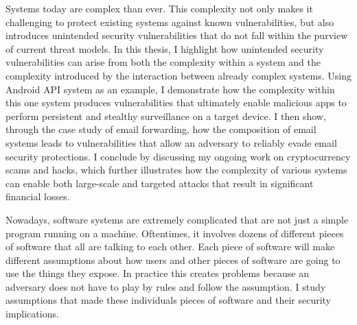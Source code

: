 \documentclass[12pt]{ucsddissertation}
\begin{document}
\begin{dissertationabstract} 
Systems today are complex than ever. This complexity not only makes it challenging to protect existing systems against known vulnerabilities, but also introduces unintended security vulnerabilities that do not fall within the purview of current threat models. In this thesis, I highlight how unintended security vulnerabilities can arise from both the complexity within a system and the complexity introduced by the interaction between already complex systems. Using Android API system as an example, I demonstrate how the complexity within this one system produces vulnerabilities that ultimately enable malicious apps to perform persistent and stealthy surveillance on a target device. I then show, through the case study of email forwarding, how the composition of email systems leads to vulnerabilities that allow an adversary to reliably evade email security protections. I conclude by discussing my ongoing work on cryptocurrency scams and hacks, which further illustrates how the complexity of various systems can enable both large-scale and targeted attacks that result in significant financial losses.

Nowadays, software systems are extremely complicated that are not just a simple program running on a machine. Oftentimes, it involves dozens of different pieces of software that all are talking to each other. Each piece of software will make different assumptions about how users and other pieces of software are going to use the things they expose. In practice this creates problems because an adversary does not have to play by rules and follow the assumption. I study assumptions that made these individuals pieces of software and their security implications.


\end{dissertationabstract}
\end{document}
